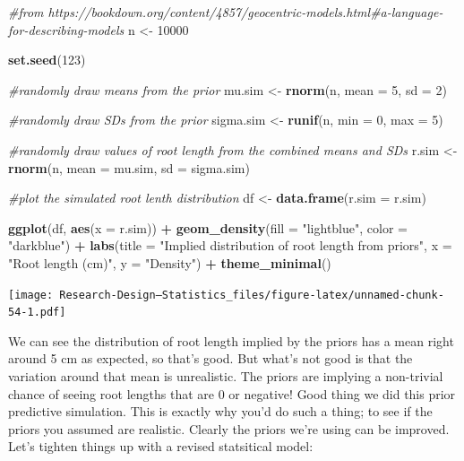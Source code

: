 \documentclass[
]{book}
\newenvironment{Shaded}{\begin{snugshade}}{\end{snugshade}}
\newcommand{\AttributeTok}[1]{\textcolor[rgb]{0.13,0.29,0.53}{#1}}
\newcommand{\CommentTok}[1]{\textcolor[rgb]{0.56,0.35,0.01}{\textit{#1}}}
\newcommand{\DecValTok}[1]{\textcolor[rgb]{0.00,0.00,0.81}{#1}}
\newcommand{\FunctionTok}[1]{\textcolor[rgb]{0.13,0.29,0.53}{\textbf{#1}}}
\newcommand{\NormalTok}[1]{#1}
\newcommand{\OtherTok}[1]{\textcolor[rgb]{0.56,0.35,0.01}{#1}}
\newcommand{\SpecialCharTok}[1]{\textcolor[rgb]{0.81,0.36,0.00}{\textbf{#1}}}
\newcommand{\StringTok}[1]{\textcolor[rgb]{0.31,0.60,0.02}{#1}}
\begin{document}
\begin{Shaded}
\begin{Highlighting}[]
\CommentTok{\#from https://bookdown.org/content/4857/geocentric{-}models.html\#a{-}language{-}for{-}describing{-}models}
\NormalTok{n }\OtherTok{\textless{}{-}} \DecValTok{10000}

\FunctionTok{set.seed}\NormalTok{(}\DecValTok{123}\NormalTok{)}

\CommentTok{\#randomly draw means from the prior}
\NormalTok{mu.sim }\OtherTok{\textless{}{-}} \FunctionTok{rnorm}\NormalTok{(n, }\AttributeTok{mean =} \DecValTok{5}\NormalTok{, }\AttributeTok{sd =} \DecValTok{2}\NormalTok{)}

\CommentTok{\#randomly draw SDs from the prior}
\NormalTok{sigma.sim }\OtherTok{\textless{}{-}} \FunctionTok{runif}\NormalTok{(n, }\AttributeTok{min =} \DecValTok{0}\NormalTok{, }\AttributeTok{max =} \DecValTok{5}\NormalTok{)}

\CommentTok{\#randomly draw values of root length from the combined means and SDs}
\NormalTok{r.sim }\OtherTok{\textless{}{-}} \FunctionTok{rnorm}\NormalTok{(n, }\AttributeTok{mean =}\NormalTok{ mu.sim, }\AttributeTok{sd =}\NormalTok{ sigma.sim)}

\CommentTok{\#plot the simulated root lenth distribution}
\NormalTok{df }\OtherTok{\textless{}{-}} \FunctionTok{data.frame}\NormalTok{(}\AttributeTok{r.sim =}\NormalTok{ r.sim)}

\FunctionTok{ggplot}\NormalTok{(df, }\FunctionTok{aes}\NormalTok{(}\AttributeTok{x =}\NormalTok{ r.sim)) }\SpecialCharTok{+}
  \FunctionTok{geom\_density}\NormalTok{(}\AttributeTok{fill =} \StringTok{"lightblue"}\NormalTok{, }\AttributeTok{color =} \StringTok{"darkblue"}\NormalTok{) }\SpecialCharTok{+}
  \FunctionTok{labs}\NormalTok{(}\AttributeTok{title =} \StringTok{"Implied distribution of root length from priors"}\NormalTok{,}
       \AttributeTok{x =} \StringTok{"Root length (cm)"}\NormalTok{,}
       \AttributeTok{y =} \StringTok{"Density"}\NormalTok{) }\SpecialCharTok{+}
  \FunctionTok{theme\_minimal}\NormalTok{()}
\end{Highlighting}
\end{Shaded}

\texttt{[image: Research-Design---Statistics\_files/figure-latex/unnamed-chunk-54-1.pdf]}

We can see the distribution of root length implied by the priors has a mean right around 5 cm as expected, so that's good. But what's not good is that the variation around that mean is unrealistic. The priors are implying a non-trivial chance of seeing root lengths that are 0 or negative! Good thing we did this prior predictive simulation. This is exactly why you'd do such a thing; to see if the priors you assumed are realistic. Clearly the priors we're using can be improved. Let's tighten things up with a revised statsitical model:
\end{document}
